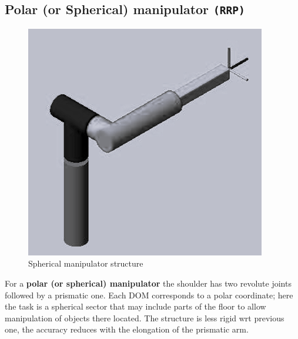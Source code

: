\subsection{Polar (or Spherical) manipulator \texttt{(RRP)}}
\begin{multicols}{2}
    \begin{figure}[H]
        \centering
        \includegraphics[scale=0.5]{img/spherical_man.png}
        \caption{Spherical manipulator structure}
    \end{figure}
    \noindent
    For a \textbf{polar (or spherical) manipulator} the shoulder has two revolute joints followed by a prismatic one. Each DOM corresponds to a polar coordinate; here the task is a spherical sector  that may include parts of the floor to allow manipulation of objects there located. The structure is less rigid wrt previous one, the accuracy reduces  with the elongation of the  prismatic arm.
\end{multicols}

